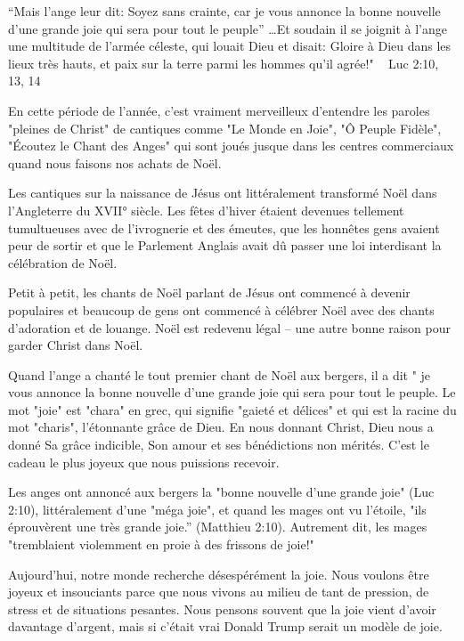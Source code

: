 

“Mais l’ange leur dit: Soyez sans crainte, car je vous annonce la bonne nouvelle d’une grande joie qui sera pour tout le peuple” …Et soudain il se joignit à l'ange une multitude de l'armée céleste, qui louait Dieu et disait: Gloire à Dieu dans les lieux très hauts, et paix sur la terre parmi les hommes qu'il agrée!" ~ Luc 2:10, 13, 14

En cette période de l'année, c'est vraiment merveilleux d'entendre les paroles "pleines de Christ" de cantiques comme "Le Monde en Joie", "Ô Peuple Fidèle", "Écoutez le Chant des Anges" qui sont joués jusque dans les centres commerciaux quand nous faisons nos achats de Noël.

Les cantiques sur la naissance de Jésus ont littéralement transformé Noël dans l'Angleterre du XVII° siècle. Les fêtes d'hiver étaient devenues tellement tumultueuses avec de l'ivrognerie et des émeutes, que les honnêtes gens avaient peur de sortir et que le Parlement Anglais avait dû passer une loi interdisant la célébration de Noël.

Petit à petit, les chants de Noël parlant de Jésus ont commencé à devenir populaires et beaucoup de gens ont commencé à célébrer Noël avec des chants d'adoration et de louange. Noël est redevenu légal – une autre bonne raison pour garder Christ dans Noël.

Quand l'ange a chanté le tout premier chant de Noël aux bergers, il a dit " je vous annonce la bonne nouvelle d’une grande joie qui sera pour tout le peuple. Le mot "joie" est "chara" en grec, qui signifie "gaieté et délices" et qui est la racine du mot "charis", l'étonnante grâce de Dieu. En nous donnant Christ, Dieu nous a donné Sa grâce indicible, Son amour et ses bénédictions non mérités. C'est le cadeau le plus joyeux que nous puissions recevoir.

Les anges ont annoncé aux bergers la "bonne nouvelle d'une grande joie" (Luc 2:10), littéralement d'une "méga joie", et quand les mages ont vu l'étoile, "ils éprouvèrent une très grande joie.” (Matthieu 2:10). Autrement dit, les mages "tremblaient violemment en proie à des frissons de joie!"

Aujourd'hui, notre monde recherche désespérément la joie. Nous voulons être joyeux et insouciants parce que nous vivons au milieu de tant de pression, de stress et de situations pesantes. Nous pensons souvent que la joie vient d'avoir davantage d'argent, mais si c'était vrai Donald Trump serait un modèle de joie.

